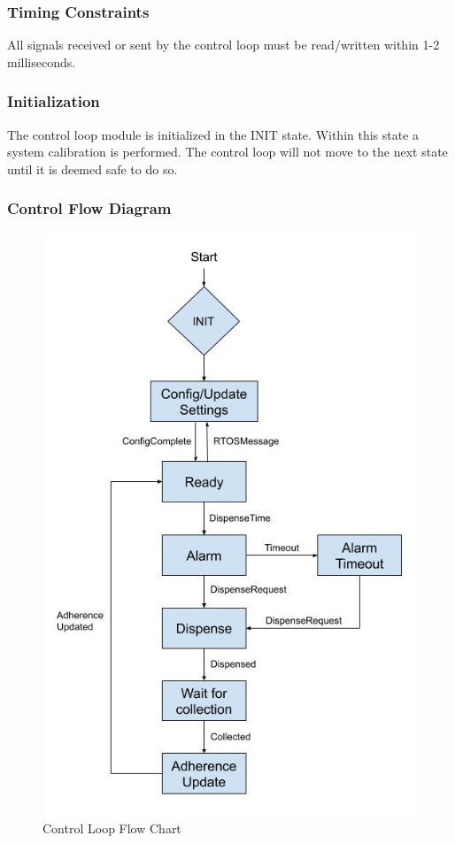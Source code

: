\documentclass[12pt,titlepage]{article}
\begin{document}
\subsubsection*{Timing Constraints}
All signals received or sent by the control loop must be read/written within 1-2 milliseconds. 

\subsubsection*{Initialization}
The control loop module is initialized in the INIT state. Within this state a system calibration is performed. The control loop will not move to the next state until it is deemed safe to do so.

\pagebreak

\subsubsection*{Control Flow Diagram}

 \begin{figure}[ht!]
  \centering
  \includegraphics[width=.7\linewidth]{system_design/Dispenser FSM.jpg}
  \caption{Control Loop Flow Chart}
\end{figure}
\end{document}
